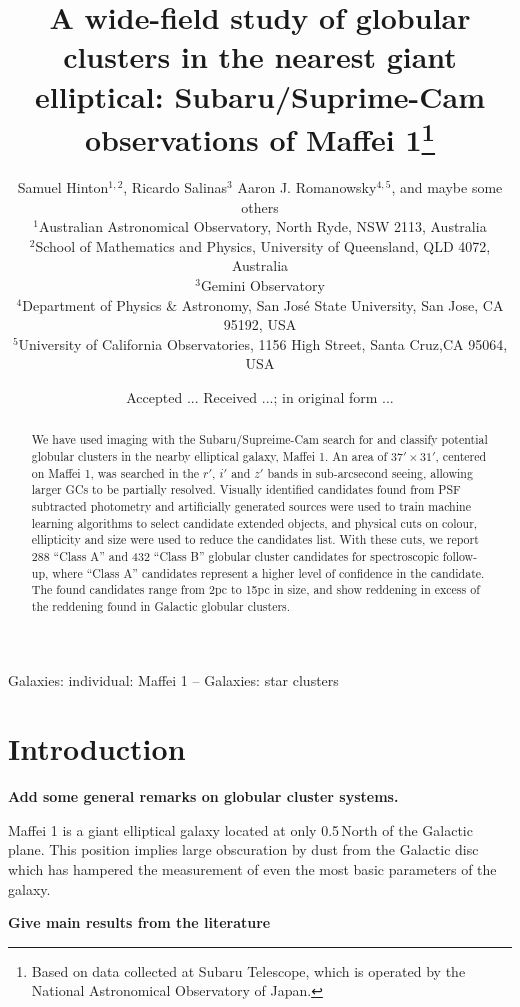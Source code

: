 \documentclass[useAMS,usenatbib]{mn2e}
\title[Globular clusters in Maffei 1]{A wide-field study of globular
  clusters in the nearest giant elliptical: Subaru/Suprime-Cam
  observations of Maffei 1\thanks{Based on data collected at Subaru
    Telescope, which is operated by the National Astronomical
    Observatory of Japan.}}
\author[S. Hinton et al.]{
Samuel Hinton$^{1,2}$, 
Ricardo Salinas$^{3}$%
Aaron J. Romanowsky$^{4,5}$, and maybe some others
\\
$^1$Australian Astronomical Observatory, North Ryde, NSW 2113, Australia \\
$^2$School of Mathematics and Physics, University of Queensland, QLD 4072, Australia \\
$^3$Gemini Observatory\\ 
$^4$Department of Physics \& Astronomy, San Jos\'e
  State University, San Jose, CA 95192, USA\\ 
$^5$University of California Observatories,
1156 High Street, Santa Cruz,CA 95064, USA
}
\begin{document}
\date{Accepted ... Received ...; in original form ...}


\pagerange{\pageref{firstpage}--\pageref{lastpage}} 

\maketitle

\label{firstpage}

\begin{abstract}
We have used imaging with the Subaru/Supreime-Cam search for and classify potential globular clusters in the nearby elliptical galaxy, Maffei 1. An area of $37'\times31'$, centered on Maffei 1, was searched in the $r'$, $i'$ and $z'$ bands in sub-arcsecond seeing, allowing larger GCs to be partially resolved. Visually identified candidates found from PSF subtracted photometry and artificially generated sources were used to train machine learning algorithms to select candidate extended objects, and physical cuts on colour, ellipticity and size were used to reduce the candidates list. With these cuts, we report 288 ``Class A'' and 432 ``Class B'' globular cluster candidates for spectroscopic follow-up, where ``Class A'' candidates represent a higher level of confidence in the candidate. The found candidates range from 2pc to 15pc in size, and show reddening in excess of the reddening found in Galactic globular clusters.
\end{abstract}

\begin{keywords}
Galaxies: individual: Maffei 1 -- Galaxies: star clusters
\end{keywords}

\section{Introduction}
\label{sec:intro}

{\bf Add some general remarks on globular cluster systems.}
 
Maffei 1 is a giant elliptical galaxy \citep{maffei68,spinrad71}
located at only 0.5\degr\,North of the Galactic plane. This position
implies large obscuration by dust from the Galactic disc which has
hampered the measurement of even the most basic parameters of the
galaxy.

{\bf Give main results from the literature}
\end{document}
